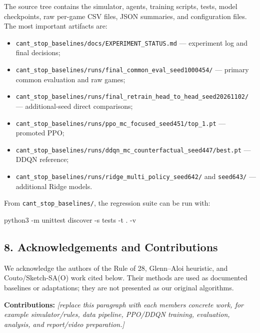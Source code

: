 \documentclass[
  11pt,
]{article}
\newenvironment{Shaded}{}{}
\newcommand{\AttributeTok}[1]{\textcolor[rgb]{0.49,0.56,0.16}{#1}}
\newcommand{\ExtensionTok}[1]{#1}
\newcommand{\NormalTok}[1]{#1}
\providecommand{\tightlist}{%
  \setlength{\itemsep}{0pt}\setlength{\parskip}{0pt}}
\begin{document}
The source tree contains the simulator, agents, training scripts, tests,
model checkpoints, raw per-game CSV files, JSON summaries, and
configuration files. The most important artifacts are:

\begin{itemize}
\tightlist
\item
  \texttt{cant\_stop\_baselines/docs/EXPERIMENT\_STATUS.md} ---
  experiment log and final decisions;
\item
  \texttt{cant\_stop\_baselines/runs/final\_common\_eval\_seed1000454/}
  --- primary common evaluation and raw games;
\item
  \texttt{cant\_stop\_baselines/runs/final\_retrain\_head\_to\_head\_seed20261102/}
  --- additional-seed direct comparisons;
\item
  \texttt{cant\_stop\_baselines/runs/ppo\_mc\_focused\_seed451/top\_1.pt}
  --- promoted PPO;
\item
  \texttt{cant\_stop\_baselines/runs/ddqn\_mc\_counterfactual\_seed447/best.pt}
  --- DDQN reference;
\item
  \texttt{cant\_stop\_baselines/runs/ridge\_multi\_policy\_seed642/} and
  \texttt{seed643/} --- additional Ridge models.
\end{itemize}

From \texttt{cant\_stop\_baselines/}, the regression suite can be run
with:

\begin{Shaded}
\begin{Highlighting}[]
\ExtensionTok{python3} \AttributeTok{{-}m}\NormalTok{ unittest discover }\AttributeTok{{-}s}\NormalTok{ tests }\AttributeTok{{-}t}\NormalTok{ . }\AttributeTok{{-}v}
\end{Highlighting}
\end{Shaded}

\subsection{8. Acknowledgements and
Contributions}\label{8-acknowledgements-and-contributions}

We acknowledge the authors of the Rule of 28, Glenn--Aloi heuristic, and
Couto/Sketch-SA(O) work cited below. Their methods are used as
documented baselines or adaptations; they are not presented as our
original algorithms.

\textbf{Contributions:} \emph{{[}replace this paragraph with each
member\textquotesingle s concrete work, for example simulator/rules,
data pipeline, PPO/DDQN training, evaluation, analysis, and report/video
preparation.{]}}
\end{document}
